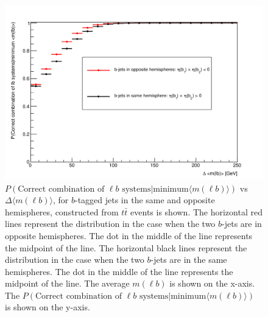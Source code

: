 \begin{figure}[h!]
	\includegraphics[width=0.6\linewidth]{figures/lbassoc_2vSM.png}
	\centering
	\caption{$P(\text{Correct combination of } \ell b \text{ systems} | \text{minimum} \langle m(\ell b) \rangle)$ vs $\Delta \langle m(\ell b) \rangle$, for $b$-tagged jets in the same and opposite hemispheres, constructed from $t\bar{t}$ events is shown. The horizontal red lines represent the distribution in the case when the two $b$-jets are in opposite hemispheres. The dot in the middle of the line represents the midpoint of the line. The horizontal black lines represent the distribution in the case when the two $b$-jets are in the same hemispheres. The dot in the middle of the line represents the midpoint of the line. The average $m(\ell b)$ is shown on the x-axis. The $P(\text{Correct combination of } \ell b \text{ systems} | \text{minimum} \langle m(\ell b) \rangle)$ is shown on the y-axis.}
	\label{fig:lb-assoc}

\end{figure}
